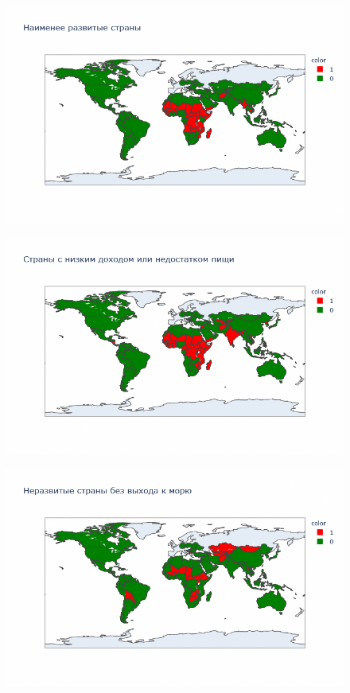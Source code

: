 \documentclass{beamer}
\begin{document}
\begin{frame}

\begin{figure}
	\centering
	\includegraphics[width=120mm]{16.png}
\end{figure}


\end{frame}


\begin{frame}

\begin{figure}
	\centering
	\includegraphics[width=120mm]{17.png}
\end{figure}


\end{frame}


\begin{frame}

\begin{figure}
	\centering
	\includegraphics[width=120mm]{18.png}
\end{figure}


\end{frame}
\end{document}
